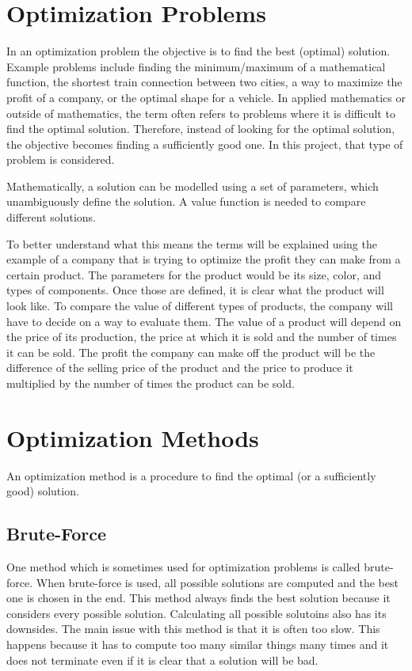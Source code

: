 \documentclass[10pt]{scrreprt}
\begin{document}
\section{Optimization Problems}
In an optimization problem the objective is to find the best (optimal) solution. Example problems include finding the minimum/maximum of a mathematical function, the shortest train connection between two cities, a way to maximize the profit of a company, or the optimal shape for a vehicle. In applied mathematics or outside of mathematics, the term often refers to problems where it is difficult to find the optimal solution. Therefore, instead of looking for the optimal solution, the objective becomes finding a sufficiently good one. In this project, that type of problem is considered.

Mathematically, a solution can be modelled using a set of parameters, which unambiguously define the solution. A value function is needed to compare different solutions. 

To better understand what this means the terms will be explained using the example of a company that is trying to optimize the profit they can make from a certain product. The parameters for the product would be its size, color, and types of components. Once those are defined, it is clear what the product will look like. To compare the value of different types of products, the company will have to decide on a way to evaluate them. The value of a product will depend on the price of its production, the price at which it is sold and the number of times it can be sold. The profit the company can make off the product will be the difference of the selling price of the product and the price to produce it multiplied by the number of times the product can be sold.

\section{Optimization Methods}
An optimization method is a procedure to find the optimal (or a sufficiently good) solution.

\subsection{Brute-Force}
One method which is sometimes used for optimization problems is called brute-force. When brute-force is used, all possible solutions are computed and the best one is chosen in the end. This method always finds the best solution because it considers every possible solution. Calculating all possible solutoins also has its downsides. The main issue with this method is that it is often too slow. This happens because it has to compute too many similar things many times and it does not terminate even if it is clear that a solution will be bad.
\end{document}
